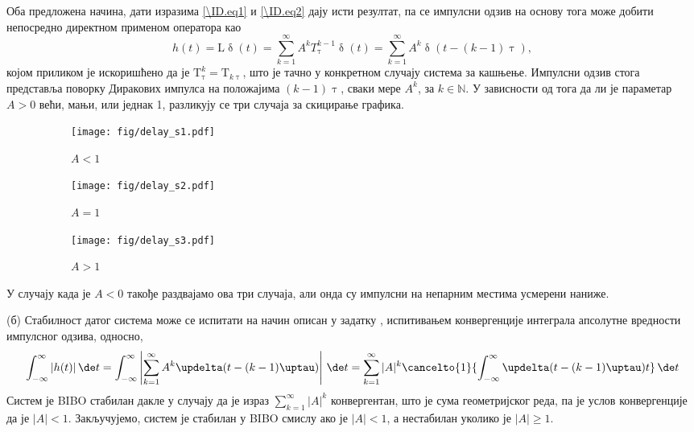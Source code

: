 Оба предложена начина, дати изразима \eqref{\ID.eq1} и \eqref{\ID.eq2} дају исти резултат, па се импулсни одзив на основу тога може добити непосредно директном 
применом оператора као 
\begin{equation}
    h(t) = \mathrm L \updelta(t) = \sum_{k = 1}^{\infty} A^{k} T_{\uptau}^{k-1} \updelta(t) = 
    \sum_{k = 1}^{\infty} A^{k} \updelta(t - (k-1)\uptau),
\end{equation}
којом приликом је искоришћено да је $\mathrm T^k_{\uptau} = \mathrm T_{k\uptau}$, што је тачно у конкретном случају система за кашњење.
Импулсни одзив стога представља поворку Диракових импулса на положајима $(k-1)\uptau$, сваки мере $A^k$, за $k \in \mathbb N$. 
У зависности од тога да ли је параметар $A > 0$ 
већи, мањи, или једнак 1, разликују се три случаја за скицирање графика. 

\begin{figure}[ht!]
    \hspace*{0pt}\hfill
    \begin{subfigure}[c]{0.33\textwidth}
        \centering
        \texttt{[image: fig/delay\_s1.pdf]}
        \caption{$A < 1$}
    \end{subfigure}
    \hspace*{0pt}\hfill
    \begin{subfigure}[c]{0.3\textwidth}
        \centering
        \texttt{[image: fig/delay\_s2.pdf]}
        \caption{$A = 1$}
    \end{subfigure}
    \hfill
    \hspace*{0pt}
    \hspace*{0pt}\hfill
    \begin{subfigure}[c]{0.3\textwidth}
        \centering
        \texttt{[image: fig/delay\_s3.pdf]}
        \caption{$A > 1$}
    \end{subfigure}
    \caption{}
\end{figure}
У случају када је $A < 0$ такође раздвајамо ова три случаја, али онда су импулсни на непарним местима усмерени наниже.

(б) Стабилност датог система може се испитати на начин описан у задатку , испитивањем конвергенције  
интеграла апсолутне вредности импулсног одзива, односно,
\begin{equation}
    \int_{-\infty}^{\infty} |h(t)| \, \de t
    = 
    \int_{-\infty}^{\infty} \left\lvert 
    \sum_{k = 1}^{\infty} A^{k} \updelta(t - (k-1)\uptau)
    \right\rvert \, \de t 
    = 
     \sum_{k = 1}^{\infty} |A|^{k} \cancelto{1}{\int_{-\infty}^{\infty} \updelta(t - (k-1)\uptau) t} \, \de t
\end{equation}
Систем је BIBO стабилан дакле у случају да је израз $\sum_{k = 1}^{\infty} |A|^{k}$ конвергентан, што је 
сума геометријског реда, па је услов конвергенције да је $|A| < 1$. Закључујемо, систем је стабилан у BIBO смислу ако је $|A| < 1$,
а нестабилан уколико је $|A| \geq 1$.   


